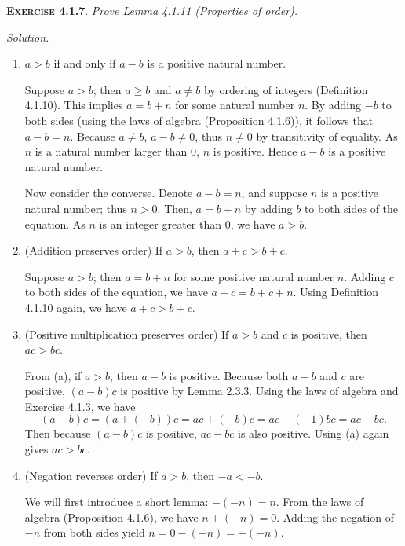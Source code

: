 \documentclass[12pt]{article}
\theoremstyle{remark}
\newenvironment{exer}[2]{
    \noindent \setlength{\parskip}{1em}%
    \textsc{\textbf{Exercise #1}}. \textit{#2} \par
    \noindent \textit{Solution.} %
}{\bigskip}
\begin{document}
\begin{exer}{4.1.7}{
    Prove Lemma 4.1.11 (Properties of order).
}
    \begin{enumerate}[topsep=0mm,label=(\alph*)]
        \item $a > b$ if and only if $a - b$ is a positive natural number.

            Suppose $a > b$; then $a \ge b$ and $a \ne b$ by ordering of integers (Definition 4.1.10).
            This implies $a = b + n$ for some natural number $n$.
            By adding $-b$ to both sides (using the laws of algebra (Proposition 4.1.6)), it follows that $a - b = n$.
            Because $a \ne b$, $a - b \ne 0$, thus $n \ne 0$ by transitivity of equality.
            As $n$ is a natural number larger than $0$, $n$ is positive.
            Hence $a - b$ is a positive natural number.

            Now consider the converse.
            Denote $a - b = n$, and suppose $n$ is a positive natural number; thus $n > 0$.
            Then, $a = b + n$ by adding $b$ to both sides of the equation.
            As $n$ is an integer greater than $0$, we have $a > b$.
            
        \item (Addition preserves order) If $a > b$, then $a + c > b + c$.

            Suppose $a > b$; then $a = b + n$ for some positive natural number $n$.
            Adding $c$ to both sides of the equation, we have $a + c = b + c + n$.
            Using Definition 4.1.10 again, we have $a + c > b + c$.
        
        \item (Positive multiplication preserves order) If $a > b$ and $c$ is positive, then $ac > bc$.

            From (a), if $a > b$, then $a - b$ is positive.
            Because both $a - b$ and $c$ are positive, $(a - b)c$ is positive by Lemma 2.3.3.
            Using the laws of algebra and Exercise 4.1.3, we have
            \[
                (a - b)c = (a + (-b))c = ac + (-b)c = ac + (-1)bc = ac - bc.
            \]
            Then because $(a - b)c$ is positive, $ac - bc$ is also positive.
            Using (a) again gives $ac > bc$.
            
        \item (Negation reverses order) If $a > b$, then $-a < -b$.

            We will first introduce a short lemma: $-(-n) = n$.
            From the laws of algebra (Proposition 4.1.6), we have $n + (-n) = 0$.
            Adding the negation of $-n$ from both sides yield $n = 0-(-n) = -(-n)$.
            

\end{enumerate}
\end{exer}
\end{document}
